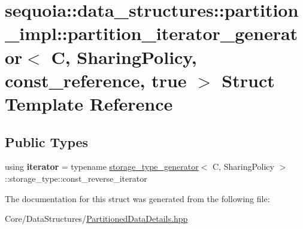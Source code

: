 \hypertarget{structsequoia_1_1data__structures_1_1partition__impl_1_1partition__iterator__generator_3_01_c_001c5afc732d082493b63c2622089d9c6c}{}\section{sequoia\+::data\+\_\+structures\+::partition\+\_\+impl\+::partition\+\_\+iterator\+\_\+generator$<$ C, Sharing\+Policy, const\+\_\+reference, true $>$ Struct Template Reference}
\label{structsequoia_1_1data__structures_1_1partition__impl_1_1partition__iterator__generator_3_01_c_001c5afc732d082493b63c2622089d9c6c}
\subsection*{Public Types}
\begin{DoxyCompactItemize}
\item 
\mbox{\label{structsequoia_1_1data__structures_1_1partition__impl_1_1partition__iterator__generator_3_01_c_001c5afc732d082493b63c2622089d9c6c_a644d05d803cdd90444295a8e51d9113e}} 
using {\bfseries iterator} = typename \mbox{\hyperlink{structsequoia_1_1data__structures_1_1partition__impl_1_1storage__type__generator}{storage\+\_\+type\+\_\+generator}}$<$ C, Sharing\+Policy $>$\+::storage\+\_\+type\+::const\+\_\+reverse\+\_\+iterator
\end{DoxyCompactItemize}


The documentation for this struct was generated from the following file\+:\begin{DoxyCompactItemize}
\item 
Core/\+Data\+Structures/\mbox{\hyperlink{_partitioned_data_details_8hpp}{Partitioned\+Data\+Details.\+hpp}}\end{DoxyCompactItemize}
